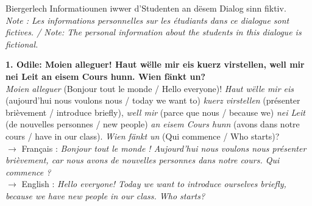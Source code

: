 Biergerlech Informatiounen iwwer d'Studenten an dësem Dialog sinn fiktiv. \\
\textit{Note : Les informations personnelles sur les étudiants dans ce dialogue sont fictives. / Note: The personal information about the students in this dialogue is fictional.}

\vspace{1.5em}

\noindent\textbf{1. Odile: Moien alleguer! Haut wëlle mir eis kuerz virstellen, well mir nei Leit an eisem Cours hunn. Wien fänkt un?}\\
\textit{Moien alleguer} (Bonjour tout le monde / Hello everyone)! \textit{Haut wëlle mir eis} (aujourd'hui nous voulons nous / today we want to) \textit{kuerz virstellen} (présenter brièvement / introduce briefly), \textit{well mir} (parce que nous / because we) \textit{nei Leit} (de nouvelles personnes / new people) \textit{an eisem Cours hunn} (avons dans notre cours / have in our class). \textit{Wien fänkt un} (Qui commence / Who starts)?\\
$\rightarrow$ Français : \textit{Bonjour tout le monde ! Aujourd'hui nous voulons nous présenter brièvement, car nous avons de nouvelles personnes dans notre cours. Qui commence ?}\\
$\rightarrow$ English : \textit{Hello everyone! Today we want to introduce ourselves briefly, because we have new people in our class. Who starts?}\\[0.5em]

